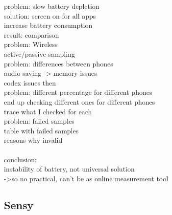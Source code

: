 problem: slow battery depletion\\
	solution: screen on for all apps\\
		increase battery consumption\\
	result: comparison\\
problem: Wireless\\
	active/passive sampling\\
problem: differences between phones\\
	audio saving -> memory issues\\
		codex issues then\\
problem: different percentage for different phones\\
	end up checking different ones for different phones\\
		trace what I checked for each\\
problem: failed samples\\
	table with failed samples\\
	reasons why invalid\\
\\
conclusion:\\
	instability of battery, not universal solution\\
		->so no practical, can't be as online measurement tool\\

\subsection{Sensy}